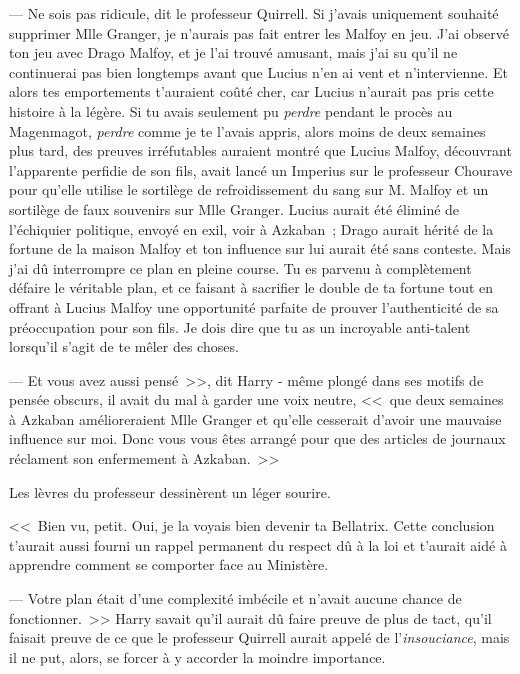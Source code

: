 --- Ne sois pas ridicule, dit le professeur Quirrell. Si j'avais uniquement souhaité supprimer Mlle Granger, je n'aurais pas fait entrer les Malfoy en jeu. J'ai observé ton jeu avec Drago Malfoy, et je l'ai trouvé amusant, mais j'ai su qu'il ne continuerai pas bien longtemps avant que Lucius n'en ai vent et n'intervienne. Et alors tes emportements t'auraient coûté cher, car Lucius n'aurait pas pris cette histoire à la légère. Si tu avais seulement pu \emph{perdre} pendant le procès au Magenmagot, \emph{perdre} comme je te l'avais appris, alors moins de deux semaines plus tard, des preuves irréfutables auraient montré que Lucius Malfoy, découvrant l'apparente perfidie de son fils, avait lancé un Imperius sur le professeur Chourave pour qu'elle utilise le sortilège de refroidissement du sang sur M. Malfoy et un sortilège de faux souvenirs sur Mlle Granger. Lucius aurait été éliminé de l'échiquier politique, envoyé en exil, voir à Azkaban~; Drago aurait hérité de la fortune de la maison Malfoy et ton influence sur lui aurait été sans conteste. Mais j'ai dû interrompre ce plan en pleine course. Tu es parvenu à complètement défaire le véritable plan, et ce faisant à sacrifier le double de ta fortune tout en offrant à Lucius Malfoy une opportunité parfaite de prouver l'authenticité de sa préoccupation pour son fils. Je dois dire que tu as un incroyable anti-talent lorsqu'il s'agit de te mêler des choses.

--- Et vous avez aussi pensé~>>, dit Harry - même plongé dans ses motifs de pensée obscurs, il avait du mal à garder une voix neutre, <<~que deux semaines à Azkaban amélioreraient Mlle Granger et qu'elle cesserait d'avoir une mauvaise influence sur moi. Donc vous vous êtes arrangé pour que des articles de journaux réclament son enfermement à Azkaban.~>>

Les lèvres du professeur dessinèrent un léger sourire.

<<~Bien vu, petit. Oui, je la voyais bien devenir ta Bellatrix. Cette conclusion t'aurait aussi fourni un rappel permanent du respect dû à la loi et t'aurait aidé à apprendre comment se comporter face au Ministère.

--- Votre plan était d'une complexité imbécile et n'avait aucune chance de fonctionner.~>> Harry savait qu'il aurait dû faire preuve de plus de tact, qu'il faisait preuve de ce que le professeur Quirrell aurait appelé de l'\emph{insouciance}, mais il ne put, alors, se forcer à y accorder la moindre importance.

